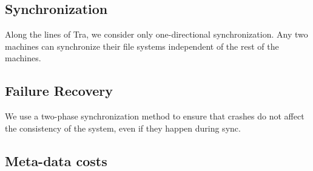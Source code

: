 \subsection{Synchronization}
Along the lines of Tra, we consider only one-directional synchronization. Any two machines can synchronize their file systems independent of the rest of the machines.

\subsection{Failure Recovery}
We use a two-phase synchronization method to ensure that crashes do not affect the consistency of the system, even if they happen during sync.

\subsection{Meta-data costs}